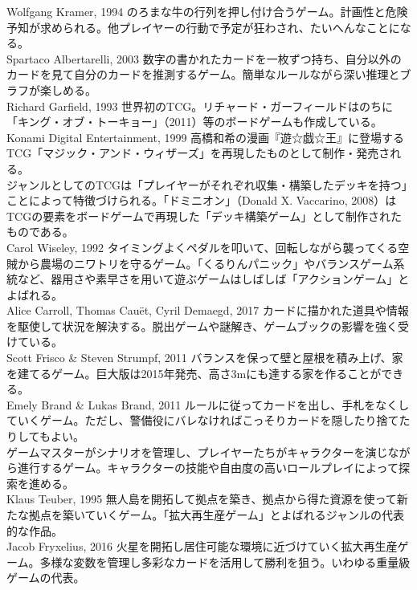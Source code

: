 \begin{tcolorbox}[colback=white,colframe=black,title=本文中で挙げたゲームについての注記]
[1] Wolfgang Kramer, 1994 のろまな牛の行列を押し付け合うゲーム。計画性と危険予知が求められる。他プレイヤーの行動で予定が狂わされ、たいへんなことになる。\\\relax
[2] Spartaco Albertarelli, 2003 数字の書かれたカードを一枚ずつ持ち、自分以外のカードを見て自分のカードを推測するゲーム。簡単なルールながら深い推理とブラフが楽しめる。\\\relax
[3] Richard Garfield, 1993 世界初のTCG。リチャード・ガーフィールドはのちに「キング・オブ・トーキョー」（2011）等のボードゲームも作成している。\\\relax
[4] Konami Digital Entertainment, 1999 高橋和希の漫画『遊☆戯☆王』に登場するTCG「マジック・アンド・ウィザーズ」を再現したものとして制作・発売される。\\\relax
[5] ジャンルとしてのTCGは「プレイヤーがそれぞれ収集・構築したデッキを持つ」ことによって特徴づけられる。「ドミニオン」（Donald X. Vaccarino, 2008）はTCGの要素をボードゲームで再現した「デッキ構築ゲーム」として制作されたものである。\\\relax
[6] Carol Wiseley, 1992 タイミングよくペダルを叩いて、回転しながら襲ってくる空賊から農場のニワトリを守るゲーム。「くるりんパニック」やバランスゲーム系統など、器用さや素早さを用いて遊ぶゲームはしばしば「アクションゲーム」とよばれる。\\\relax
[7] Alice Carroll, Thomas Cauët, Cyril Demaegd, 2017 カードに描かれた道具や情報を駆使して状況を解決する。脱出ゲームや謎解き、ゲームブックの影響を強く受けている。\\\relax
[8] Scott Frisco \& Steven Strumpf, 2011 バランスを保って壁と屋根を積み上げ、家を建てるゲーム。巨大版は2015年発売、高さ3mにも達する家を作ることができる。\\\relax
[9] Emely Brand \& Lukas Brand, 2011 ルールに従ってカードを出し、手札をなくしていくゲーム。ただし、警備役にバレなければこっそりカードを隠したり捨てたりしてもよい。\\\relax
ゲームマスターがシナリオを管理し、プレイヤーたちがキャラクターを演じながら進行するゲーム。キャラクターの技能や自由度の高いロールプレイによって探索を進める。\\\relax
[10] Klaus Teuber, 1995 無人島を開拓して拠点を築き、拠点から得た資源を使って新たな拠点を築いていくゲーム。「拡大再生産ゲーム」とよばれるジャンルの代表的な作品。\\\relax
[11] Jacob Fryxelius, 2016 火星を開拓し居住可能な環境に近づけていく拡大再生産ゲーム。多様な変数を管理し多彩なカードを活用して勝利を狙う。いわゆる重量級ゲームの代表。\\\relax

\end{tcolorbox}
